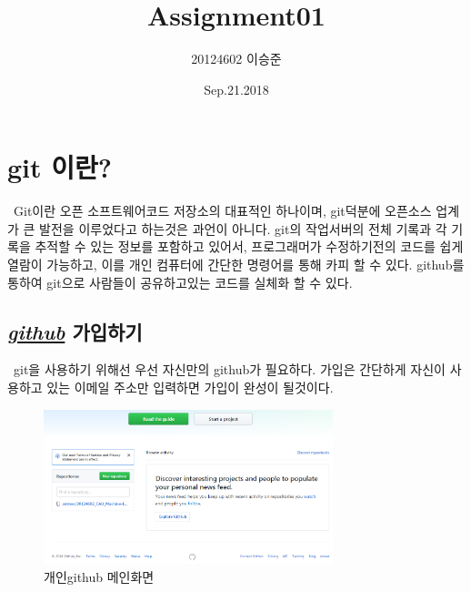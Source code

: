 \documentclass[12pt]{article}
\title{Assignment01}
\author{20124602 이승준}
\date{Sep.21.2018}
\begin{document}
  \maketitle
  \section[시작]{git 이란?}
  	\ Git이란 오픈 소프트웨어코드 저장소의 대표적인 하나이며, git덕분에 오픈소스 업계가 큰 발전을 이루었다고 하는것은 과언이 아니다. git의 작업서버의 전체 기록과 각 기록을 추적할 수 있는 정보를 포함하고 있어서, 프로그래머가 수정하기전의 코드를 쉽게 열람이 가능하고, 이를 개인 컴퓨터에 간단한 명령어를 통해 카피 할 수 있다. github를 통하여 git으로 사람들이 공유하고있는 코드를 실체화 할 수 있다.

    
  \subsection{ \textit{\href{https://git-scm.com/download/win}{github}} 가입하기}
  \ git을 사용하기 위해선 우선 자신만의 github가 필요하다. 	
  	가입은 간단하게 자신이 사용하고 있는 이메일 주소만 입력하면 가입이 완성이 될것이다.
   \begin{figure}[!hbp]
   	\centering   
   	\label{github main}
   	\includegraphics[width=0.75\textwidth]{main_github}
   	\caption{개인github 메인화면}
   \end{figure}
\end{document}
